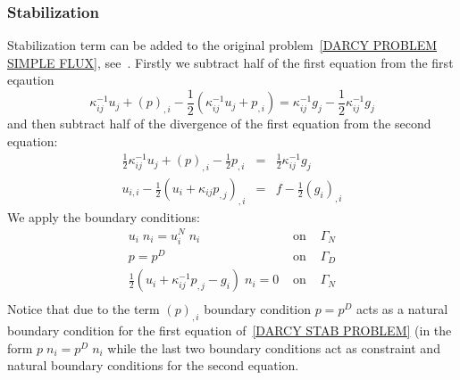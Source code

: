 \subsubsection{Stabilization \label{SEC DARCY STAB}}
Stabilization term can be added to the original problem~\ref{DARCY PROBLEM SIMPLE FLUX}, see~\cite{MasudHughes2002a}.
Firstly we subtract half of the first equation from the first eqaution
\begin{equation}\label{DARCY STAB PROBLEM A}
\kappa^{-1}_{ij} u_{j} + (p)_{,i} - \frac{1}{2} \left(  \kappa^{-1}_{ij} u_{j} + p_{,i} \right) = \kappa^{-1}_{ij} g_j -\frac{1}{2} \kappa^{-1}_{ij} g_j 
\end{equation} 
and then subtract half of the divergence of the first equation from the second equation:
\begin{equation}\label{DARCY STAB PROBLEM}
\begin{array}{rcl}
\frac{1}{2} \kappa^{-1}_{ij} u_{j} + (p)_{,i} -  \frac{1}{2}  p_{,i}  & = &  \frac{1}{2} \kappa^{-1}_{ij} g_j \\
u_{i,i} - \frac{1}{2}  \left(u_{i} +   \kappa_{ij} p_{,j} \right)_{,i} & = & f - \frac{1}{2} \left(g_{i} \right)_{,i}   
\end{array}
\end{equation} 
We apply the boundary conditions:
\begin{equation}\label{DARCY SYM STAB PROBLEM BOUNDARY}
\begin{array}{rcl}
u_{i} \; n_{i}  = u^{N}_{i}  \; n_{i} & \mbox{ on } & \Gamma_{N} \\
p = p^{D} &  \mbox{ on } & \Gamma_{D} \\ 
\frac{1}{2} \left( u_{i} +   \kappa^{-1}_{ij} p_{,j} - g_{i} \right ) \; n_{i} = 0 &  \mbox{ on } & \Gamma_{N} \\
\end{array}
\end{equation} 
Notice that due to the term $(p)_{,i}$ boundary condition $p = p^{D}$ acts as a natural boundary condition for the
first equation of~\ref{DARCY STAB PROBLEM} (in the form $p  \;  n_i = p^{D}  \;  n_i$ while the last two boundary conditions act as constraint and natural boundary conditions for the second equation.

